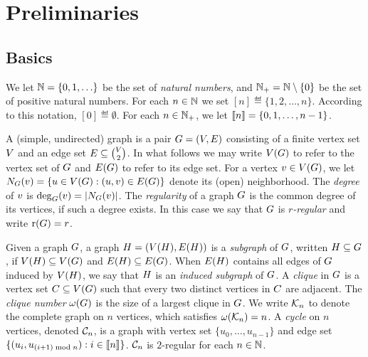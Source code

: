 \section{Preliminaries}



\subsection{Basics}

We let $\mathbb{N} =  \{0,1, \ldots \}$ be the set of {\em natural numbers}, 
and $\mathbb{N}_+= \mathbb{N} \setminus \{0\}$ be the set of positive natural numbers. 
For each $n \in \mathbb{N}$ we set $[n] \eqdef \{1,2, \ldots,n\}$. According to this notation,
$[0] \eqdef \emptyset$. For each $n \in \mathbb{N}_+$, we let $\llbracket n \rrbracket = \{0,1,\ldots,
n-1\}$. 

A (simple, undirected) graph is a pair $G = (V,E)$
consisting of a finite vertex set $V$ and an edge set 
$E \subseteq \binom{V}{2}$. In what follows we may write 
$V(G)$ to refer to the vertex set of $G$ and 
$E(G)$ to refer to its edge set. For a vertex 
$v \in V(G)$, we let 
$N_G(v) = \{u \in V(G) : (u,v) \in E(G)\}$
denote its (open) neighborhood. The \emph{degree} of $v$ is 
$\deg_G(v) = |N_G(v)|$.
The \emph{regularity} of a graph $G$ is the common degree of its vertices,
if such a degree exists. In this case we say that $G$ is \emph{$r$-regular}
and write $\mathrm{r}(G) = r$.

Given a graph $G$, a graph $H = (V(H),E(H))$ is a 
\emph{subgraph} of $G$, written $H \subseteq G$, if 
$V(H) \subseteq V(G)$ and 
$E(H) \subseteq E(G)$.
When $E(H)$ contains all edges of $G$ induced by 
$V(H)$, we say that $H$ is an \emph{induced subgraph} of $G$.
A \emph{clique} in $G$ is a vertex set 
$C \subseteq V(G)$ such that every two distinct vertices in $C$ 
are adjacent. The \emph{clique number} $\omega(G)$ is the size of a largest clique in $G$.
We write $\mathcal{K}_n$ to denote the complete graph on $n$ vertices, which satisfies 
$\omega(\mathcal{K}_n) = n$.
A \emph{cycle} on $n$ vertices, denoted $\mathcal{C}_n$, is a graph with vertex set 
$\{u_0,\dots,u_{n-1}\}$ and edge set $\{(u_i,u_{(i+1)\bmod n}) : i \in \llbracket n \rrbracket\}$.
 $\mathcal{C}_n$ is $2$-regular for each $n \in \mathbb{N}$.

